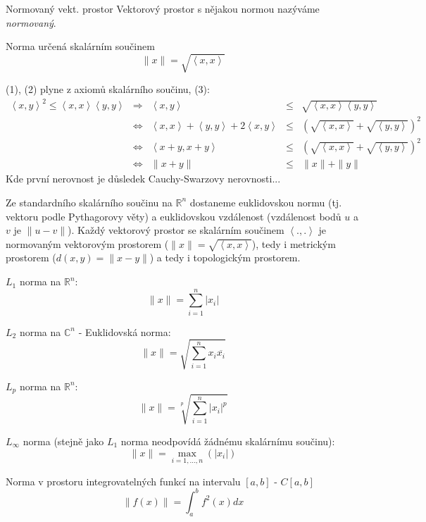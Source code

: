 \begin{definiceN}{Normovaný vekt. prostor}
Vektorový prostor s nějakou normou nazýváme \emph{normovaný}.
\end{definiceN}

\begin{priklady}
\begin{pitemize}
\item Norma určená skalárním součinem
	$$\|x\| = \sqrt{\left<x,x\right>}$$
	\begin{dukaz}
		(1), (2) plyne z axiomů skalárního součinu, (3):
		\begin{align*}
			\left<x,y\right>^2 \le \left<x,x\right>\left<y,y\right> & \Rightarrow & \left<x,y\right> & \le & \sqrt{\left<x,x\right> \left<y,y\right>} \\
			& \Leftrightarrow & \left<x,x\right>+\left<y,y\right>+2\left<x,y\right> & \le & (\sqrt{\left<x,x\right>} + \sqrt{\left<y,y\right>})^2 \\
			& \Leftrightarrow & \left<x+y,x+y\right> & \le & (\sqrt{\left<x,x\right>} + \sqrt{\left<y,y\right>})^2 \\
			& \Leftrightarrow & \|x+y\| & \le & \|x\| + \|y\|
		\end{align*}
		Kde první nerovnost je důsledek Cauchy-Swarzovy nerovnosti...

		Ze standardního skalárního součinu na $\mathbb{R}^n$ dostaneme euklidovskou normu (tj.  vektoru podle Pythagorovy věty) a euklidovskou vzdálenost (vzdálenost bodů $u$ a $v$ je $\|u-v\|$). Každý vektorový prostor se skalárním součinem $\left<.,.\right>$ je normovaným vektorovým prostorem ($\|x\|=\sqrt{\left<x,x\right>}$), tedy i metrickým prostorem ($d(x,y)=\|x-y\|$) a tedy i topologickým prostorem.
	\end{dukaz}
\item $L_1$ norma na $\mathbb{R}^n$:
	$$\|x\| = \sum_{i=1}^{n} |x_i|$$
\item $L_2$ norma na $\mathbb{C}^n$ - Euklidovská norma:
	$$\|x\| = \sqrt{\sum_{i=1}^{n} x_i \overline{x_i}}$$
\item $L_p$ norma na $\mathbb{R}^n$:
	$$\|x\| = \sqrt[p]{\sum_{i=1}^{n} |x_i|^p}$$
\item $L_{\infty}$ norma (stejně jako $L_1$ norma neodpovídá žádnému skalárnímu součinu):
	$$\|x\| = \max_{i=1,\dots,n} \left( |x_i| \right)$$
\item Norma v prostoru integrovatelných funkcí na intervalu $[a,b]$ - $C[a,b]$
	$$\|f(x)\| = \int_a^b f^2(x) dx$$
\end{pitemize}
\end{priklady}


